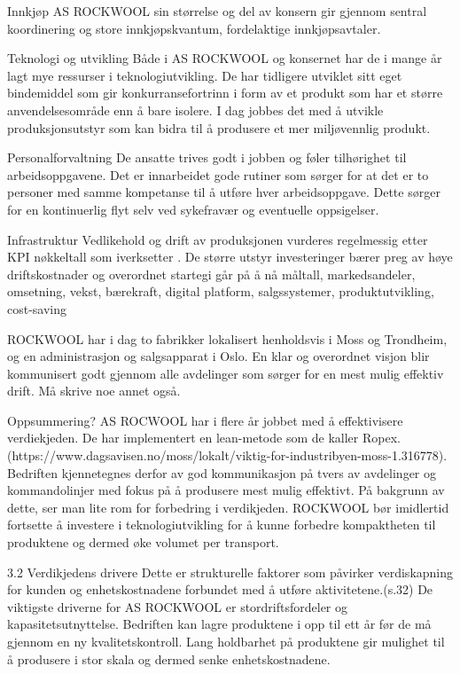 Innkjøp
AS ROCKWOOL sin størrelse og del av konsern gir gjennom sentral koordinering og store innkjøpskvantum, fordelaktige innkjøpsavtaler.

Teknologi og utvikling
Både i AS ROCKWOOL og konsernet har de i mange år lagt mye ressurser i teknologiutvikling. De har tidligere utviklet sitt eget bindemiddel som gir konkurransefortrinn i form av et produkt som har et større anvendelsesområde enn å bare isolere. I dag jobbes det med å utvikle produksjonsutstyr som kan bidra til å produsere et mer miljøvennlig produkt.

Personalforvaltning
De ansatte trives godt i jobben og føler tilhørighet til arbeidsoppgavene. Det er innarbeidet gode rutiner som sørger for at det er to personer med samme kompetanse til å utføre hver arbeidsoppgave. Dette sørger for en kontinuerlig flyt selv ved sykefravær og eventuelle oppsigelser. 

Infrastruktur
Vedlikehold og drift av produksjonen vurderes regelmessig etter KPI nøkkeltall som iverksetter . De større utstyr investeringer bærer preg av høye driftskostnader og overordnet startegi går på å nå måltall, markedsandeler, omsetning, vekst, bærekraft, digital platform, salgssystemer, produktutvikling, cost-saving


ROCKWOOL har i dag to fabrikker lokalisert henholdsvis i Moss og Trondheim, og en administrasjon og salgsapparat i Oslo. En klar og overordnet visjon blir kommunisert godt gjennom alle avdelinger som sørger for en mest mulig effektiv drift. Må skrive noe annet også.
  
Oppsummering?
AS ROCWOOL har i flere år jobbet med å effektivisere verdiekjeden. De har implementert en lean-metode som de kaller Ropex. (https://www.dagsavisen.no/moss/lokalt/viktig-for-industribyen-moss-1.316778).
Bedriften kjennetegnes derfor av god kommunikasjon på tvers av avdelinger og kommandolinjer med fokus på å produsere mest mulig effektivt. På bakgrunn av dette, ser man lite rom for forbedring i verdikjeden. ROCKWOOL bør imidlertid fortsette å investere i teknologiutvikling for å kunne forbedre kompaktheten til produktene og dermed øke volumet per transport.

3.2 Verdikjedens drivere
Dette er strukturelle faktorer som påvirker verdiskapning for kunden og enhetskostnadene forbundet med å utføre aktivitetene.(s.32) De viktigste driverne for AS ROCKWOOL er stordriftsfordeler og kapasitetsutnyttelse. Bedriften kan lagre produktene i opp til ett år før de må gjennom en ny kvalitetskontroll. Lang holdbarhet på produktene gir mulighet til å produsere i stor skala og dermed senke enhetskostnadene.

